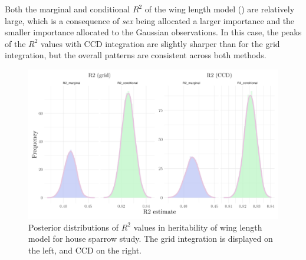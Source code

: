 Both the marginal and conditional $R^2$ of the wing length model () are relatively large, which is a consequence of \textit{sex} being allocated a larger importance and the smaller importance allocated to the Gaussian observations. In this case, the peaks of the $R^2$ values with CCD integration are slightly sharper than for the grid integration, but the overall patterns are consistent across both methods.
\begin{figure}[H]%
  \centering
  \includegraphics[width=1\linewidth]{Figures/House sparrow study/Wing_r2.png}
  \caption[Posterior distributions of $R^2$ values in wing length model for house sparrow study]{Posterior distributions of $R^2$ values in heritability of wing length model for house sparrow study. The grid integration is displayed on the left, and CCD on the right.}
  \label{fig:wing_r2}
\end{figure}

